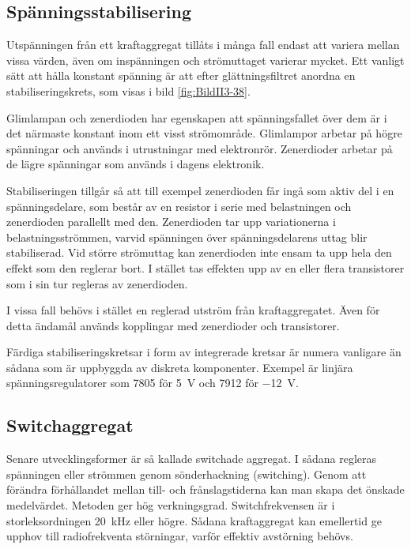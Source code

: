 
\subsection{Spänningsstabilisering}
\label{spänningsstabilisering}

Utspänningen från ett kraftaggregat tillåts i många fall endast att variera
mellan vissa värden, även om inspänningen och strömuttaget varierar mycket.
Ett vanligt sätt att hålla konstant spänning är att efter glättningsfiltret anordna en stabiliseringskrets, som visas i bild \ref{fig:BildII3-38}.

Glimlampan och zenerdioden har egenskapen att spänningsfallet över dem är i det
närmaste konstant inom ett visst strömområde.
Glimlampor arbetar på högre spänningar och används i utrustningar med
elektronrör.
Zenerdioder arbetar på de lägre spänningar som används i dagens elektronik.

Stabiliseringen tillgår så att till exempel zenerdioden får ingå som aktiv del
i en spänningsdelare, som består av en resistor i serie med belastningen och
zenerdioden parallellt med den.
Zenerdioden tar upp variationerna i belastningsströmmen, varvid spänningen över
spänningsdelarens uttag blir stabiliserad.
Vid större strömuttag kan zenerdioden inte ensam ta upp hela den effekt som den
reglerar bort.
I stället tas effekten upp av en eller flera transistorer som i sin tur
regleras av zenerdioden.

I vissa fall behövs i stället en reglerad utström från kraftaggregatet.
Även för detta ändamål används kopplingar med zenerdioder och transistorer.

Färdiga stabiliseringskretsar i form av integrerade kretsar är numera vanligare
än sådana som är uppbyggda av diskreta komponenter.
Exempel är linjära spänningsregulatorer som 7805 för \SI{5}{\volt} och 7912 för
\SI{-12}{\volt}.

\subsection{Switchaggregat}

Senare utvecklingsformer är så kallade switchade aggregat.
I sådana regleras spänningen eller strömmen genom sönderhackning (switching).
Genom att förändra förhållandet mellan till- och frånslagstiderna kan man skapa
det önskade medelvärdet.
Metoden ger hög verkningsgrad.
Switchfrekvensen är i storleksordningen \SI{20}{\kilo\hertz} eller högre.
Sådana kraftaggregat kan emellertid ge upphov till radiofrekventa störningar, varför effektiv avstörning
behövs.

